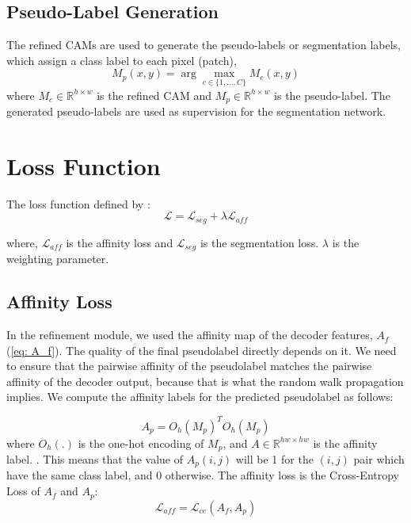 \subsection{Pseudo-Label Generation}
\label{subsec:pseudo_label_generation}
The refined CAMs are used to generate the pseudo-labels or segmentation labels, which assign a class label to each pixel (patch),
\begin{equation}
    M_p(x, y) = \arg\max_{c \in \{1, \ldots, C\}} M_c(x, y)
\end{equation}
where \( M_c \in \mathbb{R}^{h \times w} \) is the refined CAM and \( M_p \in \mathbb{R}^{h \times w} \) is the pseudo-label.
The generated pseudo-labels are used as supervision for the segmentation network.



\section{Loss Function}
\label{subsec:loss_func}

The loss function defined by \cite{wsss_frozen_clip}:
\begin{equation}
    \mathcal{L} = \mathcal{L}_{seg} + \lambda \mathcal{L}_{aff}
\end{equation}

where, $\mathcal{L}_{aff}$ is the affinity loss and $\mathcal{L}_{seg}$ is the segmentation loss. $\lambda$ is the weighting parameter.
\subsection{Affinity Loss}
\label{aff_loss}

In the refinement module, we used the affinity map of the decoder features, $A_f$ (\autoref{eq: A_f}). The quality of the final pseudolabel directly depends on it. We need to ensure that the pairwise affinity of the pseudolabel matches the pairwise affinity of the decoder output, because that is what the random walk propagation implies.
We compute the affinity labels for the predicted pseudolabel as follows:

\begin{equation}
    A_p = O_h(M_p)^TO_h(M_p)
\end{equation}
where $O_h(.)$ is the one-hot encoding of $M_p$, and $A \in \mathbb{R}^{hw \times hw}$  is the affinity label.
. This means that the value of $A_p(i,j)$ will be 1 for the $(i,j)$ pair which have the same class label, and 0 otherwise. The affinity loss is the Cross-Entropy Loss of $A_f$ and $A_p$:
\begin{equation}
    \mathcal{L}_{aff} = \mathcal{L}_{ce}(A_f, A_p)
\end{equation}

